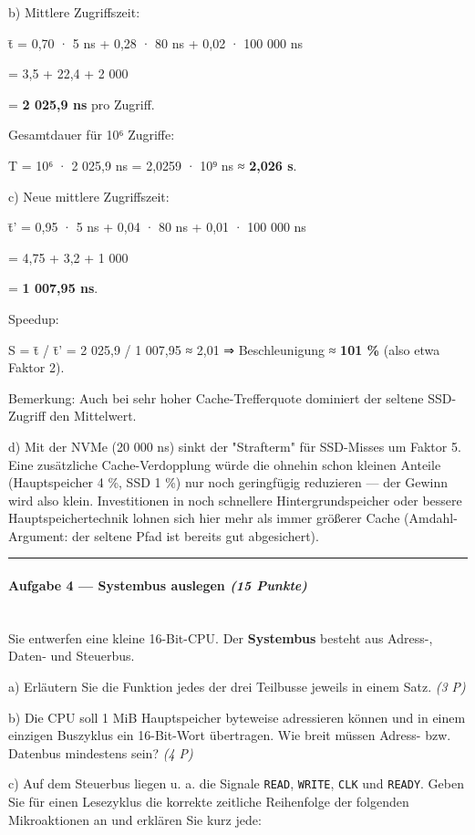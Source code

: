 \documentclass[11pt, a4paper]{article}
\begin{document}
b) Mittlere Zugriffszeit:

t̄ = 0,70 · 5 ns + 0,28 · 80 ns + 0,02 · 100 000 ns

= 3,5 + 22,4 + 2 000

= \textbf{2 025,9 ns} pro Zugriff.


Gesamtdauer für 10⁶ Zugriffe:

T = 10⁶ · 2 025,9 ns = 2,0259 · 10⁹ ns ≈ \textbf{2,026 s}.


c) Neue mittlere Zugriffszeit:

t̄' = 0,95 · 5 ns + 0,04 · 80 ns + 0,01 · 100 000 ns

= 4,75 + 3,2 + 1 000

= \textbf{1 007,95 ns}.


Speedup:

S = t̄ / t̄' = 2 025,9 / 1 007,95 ≈ 2,01 ⇒ Beschleunigung ≈ \textbf{101 \%} (also etwa Faktor 2).


Bemerkung: Auch bei sehr hoher Cache-Trefferquote dominiert der seltene SSD-Zugriff den Mittelwert.


d) Mit der NVMe (20 000 ns) sinkt der "Strafterm" für SSD-Misses um Faktor 5. Eine zusätzliche Cache-Verdopplung würde die ohnehin schon kleinen Anteile (Hauptspeicher 4 \%, SSD 1 \%) nur noch geringfügig reduzieren — der Gewinn wird also klein. Investitionen in noch schnellere Hintergrundspeicher oder bessere Hauptspeichertechnik lohnen sich hier mehr als immer größerer Cache (Amdahl-Argument: der seltene Pfad ist bereits gut abgesichert).



\noindent\textcolor{rulegray}{\rule{\linewidth}{0.4pt}}


\paragraph{Aufgabe 4 — Systembus auslegen \textit{(15 Punkte)}}\mbox{}\\[2pt]

Sie entwerfen eine kleine 16-Bit-CPU. Der \textbf{Systembus} besteht aus Adress-, Daten- und Steuerbus.


a) Erläutern Sie die Funktion jedes der drei Teilbusse jeweils in einem Satz. \textit{(3 P)}


b) Die CPU soll 1 MiB Hauptspeicher byteweise adressieren können und in einem einzigen Buszyklus ein 16-Bit-Wort übertragen. Wie breit müssen Adress- bzw. Datenbus mindestens sein? \textit{(4 P)}


c) Auf dem Steuerbus liegen u. a. die Signale \texttt{READ}, \texttt{WRITE}, \texttt{CLK} und \texttt{READY}. Geben Sie für einen Lesezyklus die korrekte zeitliche Reihenfolge der folgenden Mikroaktionen an und erklären Sie kurz jede:
\end{document}
